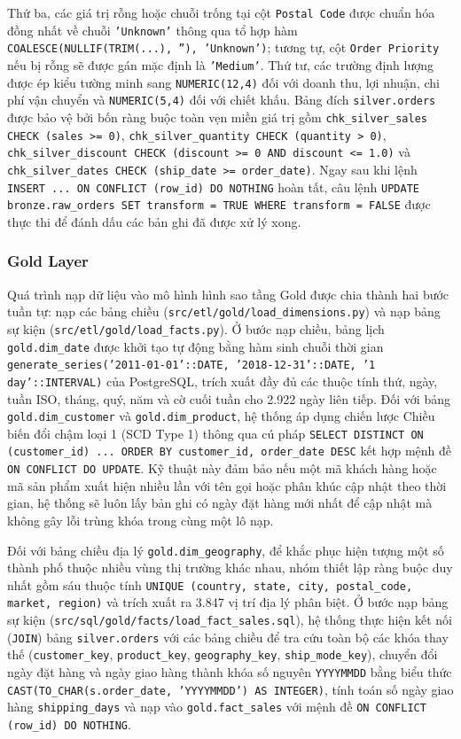Thứ ba, các giá trị rỗng hoặc chuỗi trống tại cột \texttt{Postal Code} được chuẩn hóa đồng nhất về chuỗi \texttt{'Unknown'} thông qua tổ hợp hàm \texttt{COALESCE(NULLIF(TRIM(...), ''), 'Unknown')}; tương tự, cột \texttt{Order Priority} nếu bị rỗng sẽ được gán mặc định là \texttt{'Medium'}. Thứ tư, các trường định lượng được ép kiểu tường minh sang \texttt{NUMERIC(12,4)} đối với doanh thu, lợi nhuận, chi phí vận chuyển và \texttt{NUMERIC(5,4)} đối với chiết khấu. Bảng đích \texttt{silver.orders} được bảo vệ bởi bốn ràng buộc toàn vẹn miền giá trị gồm \texttt{chk\_silver\_sales CHECK (sales >= 0)}, \texttt{chk\_silver\_quantity CHECK (quantity > 0)}, \texttt{chk\_silver\_discount CHECK (discount >= 0 AND discount <= 1.0)} và \texttt{chk\_silver\_dates CHECK (ship\_date >= order\_date)}. Ngay sau khi lệnh \texttt{INSERT ... ON CONFLICT (row\_id) DO NOTHING} hoàn tất, câu lệnh \texttt{UPDATE bronze.raw\_orders SET transform = TRUE WHERE transform = FALSE} được thực thi để đánh dấu các bản ghi đã được xử lý xong.

\subsubsection{Gold Layer}

Quá trình nạp dữ liệu vào mô hình hình sao tầng Gold được chia thành hai bước tuần tự: nạp các bảng chiều (\texttt{src/etl/gold/load\_dimensions.py}) và nạp bảng sự kiện (\texttt{src/etl/gold/load\_facts.py}). Ở bước nạp chiều, bảng lịch \texttt{gold.dim\_date} được khởi tạo tự động bằng hàm sinh chuỗi thời gian \texttt{generate\_series('2011-01-01'::DATE, '2018-12-31'::DATE, '1 day'::INTERVAL)} của PostgreSQL, trích xuất đầy đủ các thuộc tính thứ, ngày, tuần ISO, tháng, quý, năm và cờ cuối tuần cho 2.922 ngày liên tiếp. Đối với bảng \texttt{gold.dim\_customer} và \texttt{gold.dim\_product}, hệ thống áp dụng chiến lược Chiều biến đổi chậm loại 1 (SCD Type 1) thông qua cú pháp \texttt{SELECT DISTINCT ON (customer\_id) ... ORDER BY customer\_id, order\_date DESC} kết hợp mệnh đề \texttt{ON CONFLICT DO UPDATE}. Kỹ thuật này đảm bảo nếu một mã khách hàng hoặc mã sản phẩm xuất hiện nhiều lần với tên gọi hoặc phân khúc cập nhật theo thời gian, hệ thống sẽ luôn lấy bản ghi có ngày đặt hàng mới nhất để cập nhật mà không gây lỗi trùng khóa trong cùng một lô nạp.

Đối với bảng chiều địa lý \texttt{gold.dim\_geography}, để khắc phục hiện tượng một số thành phố thuộc nhiều vùng thị trường khác nhau, nhóm thiết lập ràng buộc duy nhất gồm sáu thuộc tính \texttt{UNIQUE (country, state, city, postal\_code, market, region)} và trích xuất ra 3.847 vị trí địa lý phân biệt. Ở bước nạp bảng sự kiện (\texttt{src/sql/gold/facts/load\_fact\_sales.sql}), hệ thống thực hiện kết nối (\texttt{JOIN}) bảng \texttt{silver.orders} với các bảng chiều để tra cứu toàn bộ các khóa thay thế (\texttt{customer\_key}, \texttt{product\_key}, \texttt{geography\_key}, \texttt{ship\_mode\_key}), chuyển đổi ngày đặt hàng và ngày giao hàng thành khóa số nguyên \texttt{YYYYMMDD} bằng biểu thức \texttt{CAST(TO\_CHAR(s.order\_date, 'YYYYMMDD') AS INTEGER)}, tính toán số ngày giao hàng \texttt{shipping\_days} và nạp vào \texttt{gold.fact\_sales} với mệnh đề \texttt{ON CONFLICT (row\_id) DO NOTHING}.

